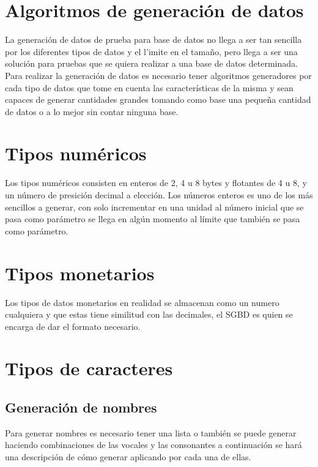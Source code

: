 \section{Algoritmos de generaci\'on de datos}
La generaci\'on de datos de prueba para base de datos no llega a ser tan sencilla por los diferentes tipos de datos y el l'imite en el tama\~no, pero llega a ser una soluci\'on  para pruebas que se quiera realizar a una base de datos determinada. Para realizar la generaci\'on de datos  es necesario tener algoritmos generadores por cada tipo de datos que tome en cuenta las caracter\'isticas de la misma  y sean capaces de generar cantidades grandes tomando como base una peque\~na cantidad de datos o a lo mejor sin contar ninguna base.
\section{Tipos num\'ericos}
Los tipos num\'ericos consisten en enteros de 2, 4 u 8 bytes y flotantes de 4 u 8, y un n\'umero de presici\'on decimal a elecci\'on.
Los n\'umeros enteros es uno de los m\'as sencillos a generar, con solo incrementar en una unidad al n\'umero  inicial que se pasa como par\'ametro se llega en alg\'un momento al l\'imite que tambi\'en se pasa como par\'ametro.
\section{Tipos monetarios}
Los tipos de datos monetarios en realidad se almacenan como un numero cualquiera y que estas tiene similitud con las decimales, el SGBD es quien se encarga de dar el formato necesario. 
\section{Tipos de caracteres}
\subsection{Generaci\'on de nombres}
Para generar nombres es necesario tener una lista o tambi\'en se puede generar haciendo combinaciones de las vocales y las consonantes a continuaci\'on se har\'a una descripci\'on de c\'omo generar aplicando por cada una de ellas.
